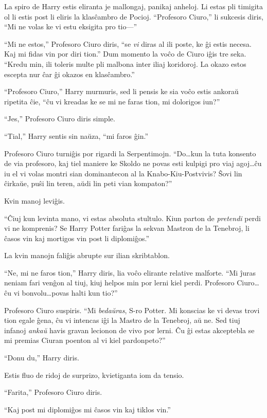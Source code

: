 La spiro de Harry estis eliranta je mallongaj, panikaj anheloj. Li
estas pli timigita ol li estis post li eliris la klasĉambro de
Pocioj. ``Profesoro Ciuro,'' li sukcesis diris, ``Mi ne volas ke vi
estu eksigita pro tio—'' 

``Mi ne estos,'' Profesoro Ciuro diris, ``se \emph{vi} diras al ili
poste, ke ĝi estis necesa. Kaj mi fidas vin por diri tion.'' Dum
momento la voĉo de Ciuro iĝis tre seka. ``Kredu min, ili toleris multe
pli malbona inter iliaj koridoroj. La okazo estos escepta nur ĉar ĝi
okazos en klasĉambro.''

``Profesoro Ciuro,'' Harry murmuris, sed li pensis ke sia voĉo estis
ankoraŭ ripetita ĉie, ``ĉu vi kreadas ke se mi ne faras tion, mi
dolorigos iun?''

``Jes,'' Profesoro Ciuro diris simple.

``Tial,'' Harry sentis sin naŭza, ``mi faros ĝin.''

Profesoro Ciuro turniĝis por rigardi la Serpentimojn. ``Do\ldots kun
la tuta konsento de via profesoro, kaj tiel maniere ke Skoldo ne povas
esti kulpigi pro viaj agoj\ldots ĉu iu el vi volas montri sian
dominantecon al la Knabo-Kiu-Postvivis? Ŝovi lin ĉirkaŭe, puŝi lin
teren, aŭdi lin peti vian kompaton?''

Kvin manoj leviĝis.

``Ĉiuj kun levinta mano, vi estas absoluta stultulo. Kiun parton de
\emph{pretendi} perdi vi ne komprenis? Se Harry Potter fariĝas la
sekvan Mastron de la Tenebroj, li ĉasos vin kaj mortigos vin post li
diplomiĝos.''

La kvin manojn faliĝis abrupte sur ilian skribtablon.

``Ne, mi ne faros tion,'' Harry diris, lia voĉo elirante relative
malforte. ``Mi ĵuras neniam fari venĝon al tiuj, kiuj helpos min por
lerni kiel perdi. Profesoro Ciuro\ldots ĉu vi bonvolu\ldots povas
halti kun tio?''

Profesoro Ciuro suspiris. ``Mi \emph{bedaŭras}, S-ro Potter. Mi
konscias ke vi devas trovi tion egale ĝena, ĉu vi intencas iĝi la
Mastro de la Tenebroj, aŭ ne. Sed tiuj infanoj \emph{ankaŭ} havis
gravan lecionon de vivo por lerni. Ĉu ĝi estas akceptebla se mi
premias Ciuran poenton al vi kiel pardonpeto?''

``Donu du,'' Harry diris.

Estis fluo de ridoj de surprizo, kvietiganta iom da tensio.

``Farita,'' Profesoro Ciuro diris.

``Kaj post mi diplomiĝos mi ĉasos vin kaj tiklos vin.''

